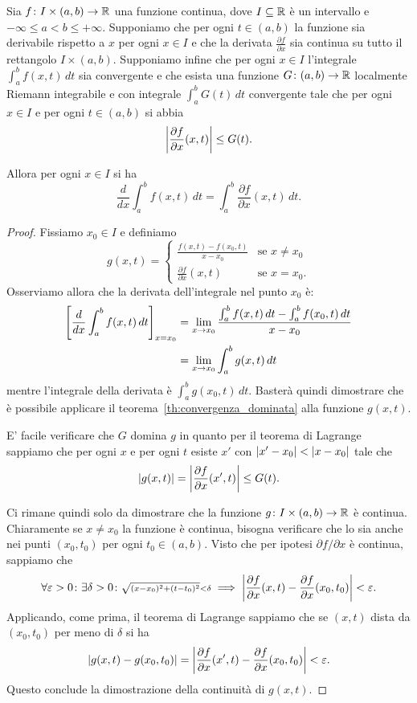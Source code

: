 \begin{theorem}%
  \mymark{**}%
  \label{th:derivata_integrale}%
%
Sia $f\colon I\times(a,b)\to {\mathbb R}$ una funzione continua, 
dove $I\subseteq {\mathbb R}$ è un intervallo e $-\infty \le a < b \le +\infty$.
Supponiamo che per ogni $t\in (a,b)$ la funzione sia derivabile rispetto a $x$
per ogni $x\in I$
e che la derivata $\frac{\partial f}{\partial x}$ sia continua su tutto il rettangolo 
$I\times(a,b)$.
Supponiamo infine che per ogni $x\in I$ l'integrale
$\int_a^b f(x,t)\, dt$ sia convergente e che
esista una funzione $G\colon(a,b)\to {\mathbb R}$ localmente Riemann integrabile 
e con integrale $\int_a^b G(t)\, dt$ convergente tale che per ogni $x\in I$ 
e per ogni $t\in (a,b)$ si abbia 
\[
  {\left|\frac{\partial f}{\partial x}(x,t)\right|} \le G(t).
\]

Allora per ogni $x\in I$ si ha
\[
  \frac{d}{dx} \int_a^b f(x,t)\, dt = \int_a^b \frac{\partial f}{\partial x}(x,t)\, dt.  
\]
\end{theorem}
%
\begin{proof}
Fissiamo $x_0\in I$ e definiamo 
\[
 g(x,t) = \begin{cases}
 \frac{f(x,t) - f(x_0,t)}{x-x_0} &\text{se $x\neq x_0$}\\
 \frac{\partial f}{\partial x}(x,t) & \text{se $x = x_0$}.
\end{cases}  
\]
Osserviamo allora che la derivata dell'integrale nel punto $x_0$ 
è:
\begin{align*}
    {\left[ \frac{d}{dx} \int_a^b f(x,t)\, dt \right]}_{x=x_0}
  &= \lim_{x\to x_0} \frac{\int_a^b f(x,t)\, dt - \int_a^b f(x_0,t)\, dt }{x-x_0}\\
  &= \lim_{x\to x_0} \int_a^b g(x,t)\, dt  
\end{align*}
mentre l'integrale della derivata è 
$\int_a^b g(x_0,t)\, dt.$
Basterà quindi dimostrare che è possibile applicare il teorema~\ref{th:convergenza_dominata}
alla funzione $g(x,t)$.

E' facile verificare che $G$ domina $g$ in quanto per il teorema di Lagrange sappiamo 
che per ogni $x$ e per ogni $t$ esiste $x'$ con ${\left|x'-x_0\right|}<{\left|x-x_0\right|}$ tale che 
\[
  {\left|g(x,t)\right|} = {\left|\frac{\partial f}{\partial x}(x',t)\right|} \le G(t).
\]

Ci rimane quindi solo da dimostrare che la funzione $g\colon I\times (a,b)\to {\mathbb R}$ 
è continua. 
Chiaramente se $x\neq x_0$ la funzione è continua, bisogna verificare che lo 
sia anche nei punti $(x_0,t_0)$ per ogni $t_0\in (a,b)$. 
Visto che per ipotesi $\partial f / \partial x$ è continua, sappiamo 
che 
\[
  \forall \varepsilon>0 \colon \exists \delta>0\colon 
  {\scriptstyle\sqrt{(x-x_0)^2+(t-t_0)^2}<\delta} 
  \implies {\left|\frac{\partial f}{\partial x}(x,t) - \frac{\partial f}{\partial x}(x_0,t_0)\right|}<\varepsilon.
\]
Applicando, come prima, il teorema di Lagrange sappiamo che se $(x,t)$ dista da $(x_0,t_0)$
per meno di $\delta$ si ha 
\[
{\left|g(x,t) - g(x_0,t_0)\right|} 
= {\left|\frac{\partial f}{\partial x}(x',t) - \frac{\partial f}{\partial x}(x_0,t_0)\right|}
 < \varepsilon.
\]
Questo conclude la dimostrazione della continuità di $g(x,t)$.
\end{proof}

